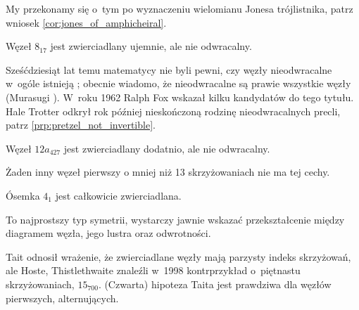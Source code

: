 My przekonamy się o~tym po wyznaczeniu wielomianu Jonesa trójlistnika, patrz wniosek \ref{cor:jones_of_amphicheiral}.

\begin{example}
    Węzeł $8_{17}$ jest zwierciadlany ujemnie, ale nie odwracalny.
\end{example}

Sześćdziesiąt lat temu matematycy nie byli pewni, czy węzły nieodwracalne w~ogóle istnieją \cite[problem 10]{fox62};
obecnie wiadomo, że nieodwracalne są prawie wszystkie węzły (Murasugi \cite[s.~46]{murasugi96}).
%
W~roku 1962 Ralph Fox wskazał kilku kandydatów do tego tytułu.
%
Hale Trotter odkrył rok później nieskończoną rodzinę nieodwracalnych precli, patrz \ref{prp:pretzel_not_invertible}.
%


\begin{example}
    Węzeł $12a_{427}$ jest zwierciadlany dodatnio, ale nie odwracalny.
\end{example}

Żaden inny węzeł pierwszy o mniej niż 13 skrzyżowaniach nie ma tej cechy.

\begin{example}
\label{property_of_eight_knot}%
    Ósemka $4_1$ jest całkowicie zwierciadlana.
\end{example}

To najprostszy typ symetrii, wystarczy jawnie wskazać przekształcenie między diagramem węzła, jego lustra oraz odwrotności.

Tait odnosił wrażenie, że zwierciadlane węzły mają parzysty indeks skrzyżowań, ale Hoste, Thistlethwaite znaleźli w~1998 kontrprzykład o~piętnastu skrzyżowaniach, $15_{700}$. %
(Czwarta) hipoteza Taita jest prawdziwa dla węzłów pierwszych, alternujących.

